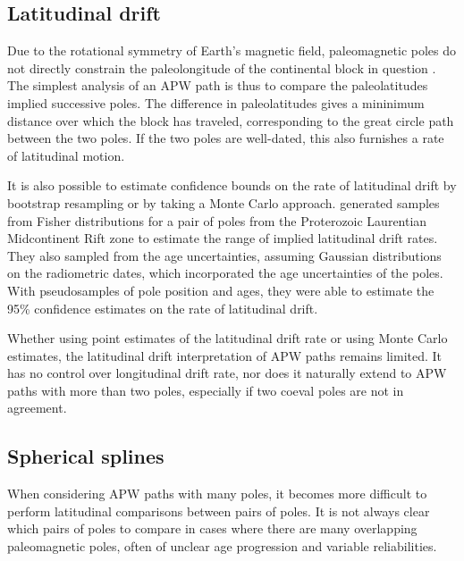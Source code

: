 \documentclass[preprint,12pt,authoryear]{elsarticle}
\begin{document}
\subsection{Latitudinal drift}
\label{sec:latitudinal_drift}
Due to the rotational symmetry of Earth's magnetic field, paleomagnetic poles do not
directly constrain the paleolongitude of the continental block in question \citep{butler1992paleomagnetism}.
The simplest analysis of an APW path is thus to compare the paleolatitudes implied successive poles.
The difference in paleolatitudes gives a mininimum distance over which the block has traveled, 
corresponding to the great circle path between the two poles. If the two poles are well-dated,
this also furnishes a rate of latitudinal motion.

It is also possible to estimate confidence bounds on the rate of latitudinal drift by
bootstrap resampling \citep[e.g.][]{tarduno1990fast} or by taking a Monte Carlo approach. 
\citet{swanson2014confirmation} generated samples from Fisher distributions
for a pair of poles from the Proterozoic Laurentian Midcontinent Rift zone to estimate the range
of implied latitudinal drift rates. They also sampled from the age uncertainties, assuming
Gaussian distributions on the radiometric dates, which incorporated the age uncertainties of the poles.
With pseudosamples of pole position and ages, they were able to estimate the 95\% 
confidence estimates on the rate of latitudinal drift.

Whether using point estimates of the latitudinal drift rate or using Monte Carlo estimates, 
the latitudinal drift interpretation of APW paths remains limited.
It has no control over longitudinal drift rate, 
nor does it naturally extend to APW paths with more than two poles, 
especially if two coeval poles are not in agreement.

\subsection{Spherical splines}
\label{sec:spherical_splines}
When considering APW paths with many poles, it becomes more difficult to perform
latitudinal comparisons between pairs of poles. It is not always clear which pairs of
poles to compare in cases where there are many overlapping paleomagnetic poles,
often of unclear age progression and variable reliabilities.
\end{document}
